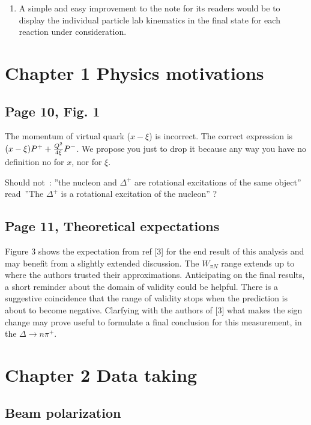 \documentclass[11pt]{paper}
\begin{document}
\begin{enumerate}
\item A simple and easy improvement to the note for its readers would be to display the individual particle lab kinematics in the final state for each reaction under consideration.

\end{enumerate} 

\newpage

\section*{Chapter 1 Physics motivations}


\subsection*{Page 10, Fig. 1}

The momentum of virtual quark ($x-\xi$) is incorrect. The correct expression
is $(x-\xi)P^+ + {{Q^2}\over{4\xi}}  P^-$. We propose you just to drop it because any way you have no definition no for $x$, nor for $\xi$.

Should not~: ''the nucleon and $\Delta^+$ are rotational excitations of the same object''
read~''The $\Delta^+$ is a rotational excitation of the nucleon'' ?

\subsection*{Page 11, Theoretical expectations}
Figure 3 shows the expectation from ref [3] for the end result of this analysis and may benefit from a slightly extended discussion.
The $W_{\pi N} $ range extends up to where the authors trusted their approximations.
Anticipating on the final results, a short reminder about the domain of validity could be helpful.
There is a suggestive coincidence that the range of validity stops when the prediction is about to become negative.
Clarfying with the authors of [3] what makes the sign change may prove useful to formulate a final conclusion for this measurement, in the $\Delta\rightarrow n\pi^+$.

\section*{Chapter 2 Data taking}

\subsection*{Beam polarization}
\end{document}
